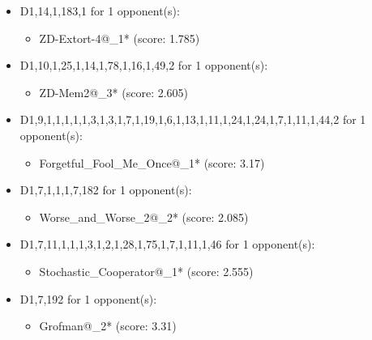\begin{appendices}
\begin{itemize}
    \item D1,14,1,183,1 for 1 opponent(s):
    \begin{multicols}{3}
         \begin{itemize}
            \item ZD-Extort-4@\_1* (score: 1.785)
        \end{itemize}
     \end{multicols}
     
    \item D1,10,1,25,1,14,1,78,1,16,1,49,2 for 1 opponent(s):
    \begin{multicols}{3}
         \begin{itemize}
            \item ZD-Mem2@\_3* (score: 2.605)
        \end{itemize}
     \end{multicols}
     
    \item D1,9,1,1,1,1,1,3,1,3,1,7,1,19,1,6,1,13,1,11,1,24,1,24,1,7,1,11,1,44,2 for 1 opponent(s):
    \begin{multicols}{3}
         \begin{itemize}
            \item Forgetful\_Fool\_Me\_Once@\_1* (score: 3.17)
        \end{itemize}
     \end{multicols}
     
    \item D1,7,1,1,1,7,182 for 1 opponent(s):
    \begin{multicols}{3}
         \begin{itemize}
            \item Worse\_and\_Worse\_2@\_2* (score: 2.085)
        \end{itemize}
     \end{multicols}
     
    \item D1,7,11,1,1,1,3,1,2,1,28,1,75,1,7,1,11,1,46 for 1 opponent(s):
    \begin{multicols}{3}
         \begin{itemize}
            \item Stochastic\_Cooperator@\_1* (score: 2.555)
        \end{itemize}
     \end{multicols}
     
    \item D1,7,192 for 1 opponent(s):
    \begin{multicols}{3}
         \begin{itemize}
            \item Grofman@\_2* (score: 3.31)
        \end{itemize}
     \end{multicols}
     

\end{itemize}
\end{appendices}
